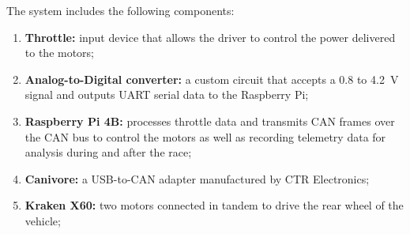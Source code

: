 \documentclass[12pt]{article}
\begin{document}
The system includes the following components:
\begin{enumerate}
  \item \textbf{Throttle:} input device that allows the driver to control
        the power delivered to the motors;
  \item \textbf{Analog-to-Digital converter:} a custom circuit that accepts
        a 0.8 to 4.2~V signal and outputs UART serial data to the
        Raspberry Pi;
  \item \textbf{Raspberry Pi 4B:} processes throttle data and transmits CAN
        frames over the CAN bus to control the motors as well as recording telemetry data for analysis during and after the race;
  \item \textbf{Canivore:} a USB-to-CAN adapter manufactured by CTR
        Electronics;
  \item \textbf{Kraken X60:} two motors connected in tandem to drive the
        rear wheel of the vehicle;
\end{enumerate}
\end{document}
